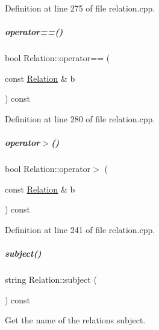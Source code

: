 Definition at line 275 of file relation.\+cpp.

\mbox{\label{group__icubclient__representations_a990fdaafe95a48d4a84b797f5a8e0871}} 
\subparagraph{\texorpdfstring{operator==()}{operator==()}}
{\footnotesize\ttfamily bool Relation\+::operator== (\begin{DoxyParamCaption}\item[{const \hyperlink{group__icubclient__representations_classicubclient_1_1Relation}{Relation} \&}]{b }\end{DoxyParamCaption}) const}



Definition at line 280 of file relation.\+cpp.

\mbox{\label{group__icubclient__representations_a0d96d3ec8edb6dc1898eaf7cfbb7086e}} 
\subparagraph{\texorpdfstring{operator$>$()}{operator>()}}
{\footnotesize\ttfamily bool Relation\+::operator$>$ (\begin{DoxyParamCaption}\item[{const \hyperlink{group__icubclient__representations_classicubclient_1_1Relation}{Relation} \&}]{b }\end{DoxyParamCaption}) const}



Definition at line 241 of file relation.\+cpp.

\mbox{\label{group__icubclient__representations_a7001a61802fd1292a54b20ab4bb2565e}} 
\subparagraph{\texorpdfstring{subject()}{subject()}}
{\footnotesize\ttfamily string Relation\+::subject (\begin{DoxyParamCaption}{ }\end{DoxyParamCaption}) const}



Get the name of the relation\textquotesingle{}s subject. 



